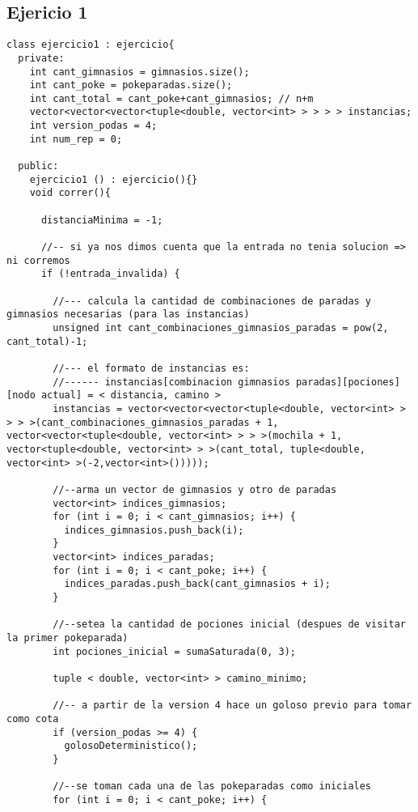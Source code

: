 \newpage



\subsection{Ejericio 1}
\label{sec: anexo_ejercicio1}
\begin{lstlisting}
class ejercicio1 : ejercicio{
  private:
    int cant_gimnasios = gimnasios.size();
    int cant_poke = pokeparadas.size();
    int cant_total = cant_poke+cant_gimnasios; // n+m
    vector<vector<vector<tuple<double, vector<int> > > > > instancias;
    int version_podas = 4;
    int num_rep = 0;

  public:
    ejercicio1 () : ejercicio(){}
    void correr(){

      distanciaMinima = -1;

      //-- si ya nos dimos cuenta que la entrada no tenia solucion => ni corremos
      if (!entrada_invalida) {

        //--- calcula la cantidad de combinaciones de paradas y gimnasios necesarias (para las instancias)
        unsigned int cant_combinaciones_gimnasios_paradas = pow(2, cant_total)-1;

        //--- el formato de instancias es:
        //------ instancias[combinacion gimnasios paradas][pociones][nodo actual] = < distancia, camino >
        instancias = vector<vector<vector<tuple<double, vector<int> > > > >(cant_combinaciones_gimnasios_paradas + 1, vector<vector<tuple<double, vector<int> > > >(mochila + 1, vector<tuple<double, vector<int> > >(cant_total, tuple<double, vector<int> >(-2,vector<int>()))));
  
        //--arma un vector de gimnasios y otro de paradas
        vector<int> indices_gimnasios;
        for (int i = 0; i < cant_gimnasios; i++) {
          indices_gimnasios.push_back(i);
        }
        vector<int> indices_paradas;
        for (int i = 0; i < cant_poke; i++) {
          indices_paradas.push_back(cant_gimnasios + i);
        }

        //--setea la cantidad de pociones inicial (despues de visitar la primer pokeparada)
        int pociones_inicial = sumaSaturada(0, 3);

        tuple < double, vector<int> > camino_minimo;

        //-- a partir de la version 4 hace un goloso previo para tomar como cota
        if (version_podas >= 4) {
          golosoDeterministico();
        }
  
        //--se toman cada una de las pokeparadas como iniciales 
        for (int i = 0; i < cant_poke; i++) {


\end{lstlisting}

